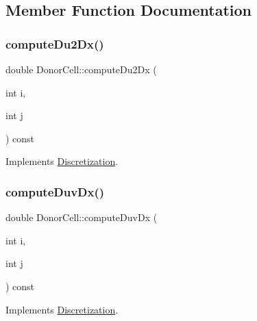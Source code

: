 \subsection{Member Function Documentation}
\mbox{\label{classDonorCell_a191338f4c9d03f2fcf202ab865f28446}} 
\subsubsection{\texorpdfstring{computeDu2Dx()}{computeDu2Dx()}}
{\footnotesize\ttfamily double Donor\+Cell\+::compute\+Du2\+Dx (\begin{DoxyParamCaption}\item[{int}]{i,  }\item[{int}]{j }\end{DoxyParamCaption}) const\hspace{0.3cm}{\ttfamily [virtual]}}



Implements \mbox{\hyperlink{classDiscretization_acca6bf193e0e91f645d292527299254b}{Discretization}}.

\mbox{\label{classDonorCell_a15d34de5bfaf3ef3bb8713f7b5474b56}} 
\subsubsection{\texorpdfstring{computeDuvDx()}{computeDuvDx()}}
{\footnotesize\ttfamily double Donor\+Cell\+::compute\+Duv\+Dx (\begin{DoxyParamCaption}\item[{int}]{i,  }\item[{int}]{j }\end{DoxyParamCaption}) const\hspace{0.3cm}{\ttfamily [virtual]}}



Implements \mbox{\hyperlink{classDiscretization_ab1c2aa237e13e7c4c9edd429de656795}{Discretization}}.

\mbox{\label{classDonorCell_a9255ed63d7d334c01be6204fcd457699}} 
